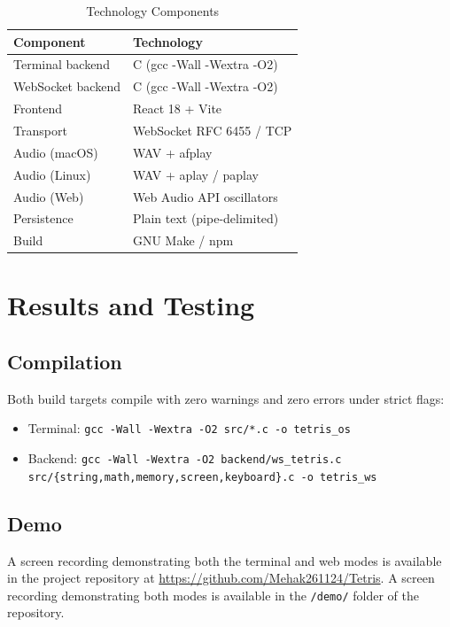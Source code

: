 \documentclass[conference]{IEEEtran}
\begin{document}
\begin{table}[H]
\centering
\caption{Technology Components}
\begin{tabular}{ll}
\toprule
\textbf{Component}  & \textbf{Technology}               \\
\midrule
Terminal backend    & C (gcc -Wall -Wextra -O2)         \\
WebSocket backend   & C (gcc -Wall -Wextra -O2)         \\
Frontend            & React 18 + Vite                   \\
Transport           & WebSocket RFC 6455 / TCP          \\
Audio (macOS)       & WAV + afplay                      \\
Audio (Linux)       & WAV + aplay / paplay              \\
Audio (Web)         & Web Audio API oscillators         \\
Persistence         & Plain text (pipe-delimited)       \\
Build               & GNU Make / npm                    \\
\bottomrule
\end{tabular}
\end{table}

\section{Results and Testing}

\subsection{Compilation}
Both build targets compile with zero warnings and zero errors under strict flags:
\begin{itemize}
  \item Terminal: \texttt{gcc -Wall -Wextra -O2 src/*.c -o tetris\_os}
  \item Backend:  \texttt{gcc -Wall -Wextra -O2 backend/ws\_tetris.c src/\{string,math,memory,screen,keyboard\}.c -o tetris\_ws}
\end{itemize}

\subsection{Demo}
A screen recording demonstrating both the terminal and web modes is available in the project repository at \url{https://github.com/Mehak261124/Tetris}. A screen recording demonstrating both modes is available in the \texttt{/demo/} folder of the repository.
\end{document}
